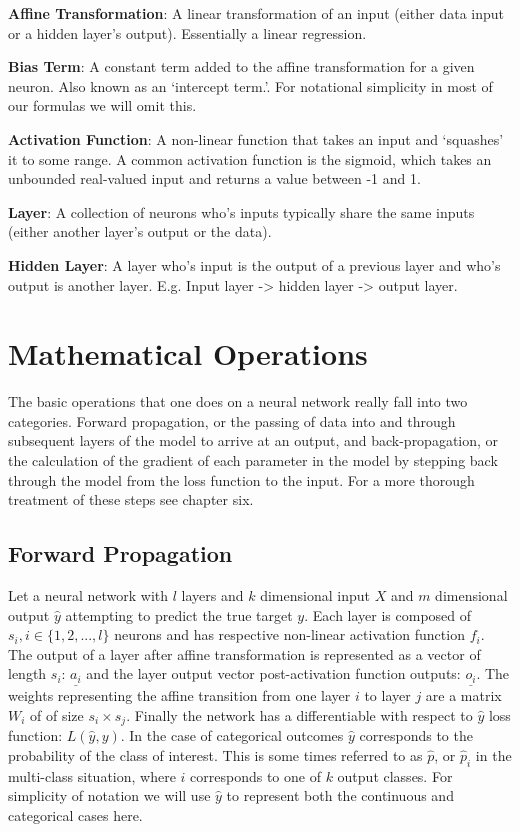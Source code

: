 \documentclass[]{book}
\theoremstyle{definition}
\theoremstyle{definition}
\theoremstyle{definition}
\theoremstyle{remark}
\begin{document}
\textbf{Affine Transformation}: A linear transformation of an input
(either data input or a hidden layer's output). Essentially a linear
regression.

\textbf{Bias Term}: A constant term added to the affine transformation
for a given neuron. Also known as an `intercept term.'. For notational
simplicity in most of our formulas we will omit this.

\textbf{Activation Function}: A non-linear function that takes an input
and `squashes' it to some range. A common activation function is the
sigmoid, which takes an unbounded real-valued input and returns a value
between -1 and 1.

\textbf{Layer}: A collection of neurons who's inputs typically share the
same inputs (either another layer's output or the data).

\textbf{Hidden Layer}: A layer who's input is the output of a previous
layer and who's output is another layer. E.g. Input layer
-\textgreater{} hidden layer -\textgreater{} output layer.

\section{Mathematical Operations}\label{mathematical-operations}

The basic operations that one does on a neural network really fall into
two categories. Forward propagation, or the passing of data into and
through subsequent layers of the model to arrive at an output, and
back-propagation, or the calculation of the gradient of each parameter
in the model by stepping back through the model from the loss function
to the input. For a more thorough treatment of these steps see
\citet{goodfellow_DL} chapter six.

\subsection{Forward Propagation}\label{forward-propagation}

Let a neural network with \(l\) layers and \(k\) dimensional input \(X\)
and \(m\) dimensional output \(\hat{y}\) attempting to predict the true
target \(y\). Each layer is composed of \(s_i, i \in \{1, 2, ...,l\}\)
neurons and has respective non-linear activation function \(f_i\). The
output of a layer after affine transformation is represented as a vector
of length \(s_i\): \(\underline{a_i}\) and the layer output vector
post-activation function outputs: \(\underline{o_i}\). The weights
representing the affine transition from one layer \(i\) to layer \(j\)
are a matrix \(W_i\) of of size \(s_{i} \times s_j\). Finally the
network has a differentiable with respect to \(\hat{y}\) loss function:
\(L(\hat{y}, y)\). In the case of categorical outcomes \(\hat{y}\)
corresponds to the probability of the class of interest. This is some
times referred to as \(\hat{p}\), or \(\hat{p}_i\) in the multi-class
situation, where \(i\) corresponds to one of \(k\) output classes. For
simplicity of notation we will use \(\hat{y}\) to represent both the
continuous and categorical cases here.
\end{document}
